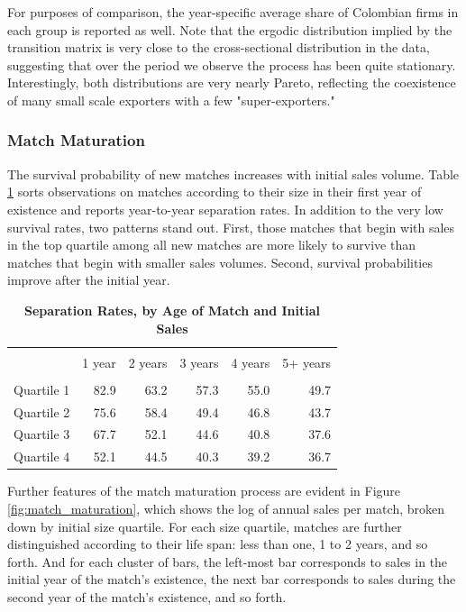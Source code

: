 For purposes of comparison, the year-specific average share of Colombian
firms in each group is reported as well. Note that the ergodic distribution
implied by the transition matrix is very close to the cross-sectional
distribution in the data, suggesting that over the period we observe the
process has been quite stationary. Interestingly, both distributions are
very nearly Pareto, reflecting the coexistence of many small scale exporters
with a few "super-exporters."

\subsubsection{Match Maturation}

The survival probability of new matches increases with initial sales volume.
Table \ref{tab:sep_rates} sorts observations on matches according to their
size in their first year of existence and reports year-to-year separation
rates. In addition to the very low survival rates, two patterns stand out.
First, those matches that begin with sales in the top quartile among all new
matches are more likely to survive than matches that begin with smaller
sales volumes. Second, survival probabilities improve after the initial year.

\begin{table}[tbph]
    \centering
    \begin{tabular}{l|rrrrr} \hline \hline \\
                   & 1 year & 2 years & 3 years & 4 years & 5+ years \\ \hline \\
        Quartile 1 & 82.9   & 63.2    & 57.3    & 55.0    & 49.7 \\
        Quartile 2 & 75.6   & 58.4    & 49.4    & 46.8    & 43.7 \\
        Quartile 3 & 67.7   & 52.1    & 44.6    & 40.8    & 37.6 \\
        Quartile 4 & 52.1   & 44.5    & 40.3    & 39.2    & 36.7 \\ \hline
    \end{tabular}
    \caption{\textbf{Separation Rates, by Age of Match and Initial Sales}}
    \label{tab:sep_rates}\centering
\end{table}

Further features of the match maturation process are evident in Figure \ref{fig:match_maturation}, which shows the log of annual sales per match,
broken down by initial size quartile. For each size quartile, matches are
further distinguished according to their life span: less than one, 1 to 2
years, and so forth. And for each cluster of bars, the left-most bar
corresponds to sales in the initial year of the match's existence, the next
bar corresponds to sales during the second year of the match's existence,
and so forth.

